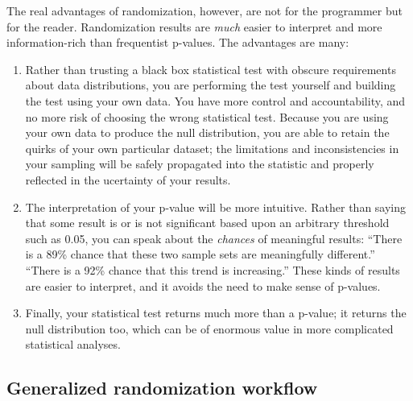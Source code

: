 \documentclass[]{book}
\begin{document}
The real advantages of randomization, however, are not for the programmer but for the reader. Randomization results are \emph{much} easier to interpret and more information-rich than frequentist p-values. The advantages are many:

\begin{enumerate}
\def\labelenumi{\arabic{enumi}.}
\item
  Rather than trusting a black box statistical test with obscure requirements about data distributions, you are performing the test yourself and building the test using your own data. You have more control and accountability, and no more risk of choosing the wrong statistical test. Because you are using your own data to produce the null distribution, you are able to retain the quirks of your own particular dataset; the limitations and inconsistencies in your sampling will be safely propagated into the statistic and properly reflected in the ucertainty of your results.
\item
  The interpretation of your p-value will be more intuitive. Rather than saying that some result is or is not significant based upon an arbitrary threshold such as 0.05, you can speak about the \emph{chances} of meaningful results: ``There is a 89\% chance that these two sample sets are meaningfully different.'' ``There is a 92\% chance that this trend is increasing.'' These kinds of results are easier to interpret, and it avoids the need to make sense of p-values.
\item
  Finally, your statistical test returns much more than a p-value; it returns the null distribution too, which can be of enormous value in more complicated statistical analyses.
\end{enumerate}

\hypertarget{generalized-randomization-workflow}{%
\subsection*{Generalized randomization workflow}\label{generalized-randomization-workflow}}
\end{document}
